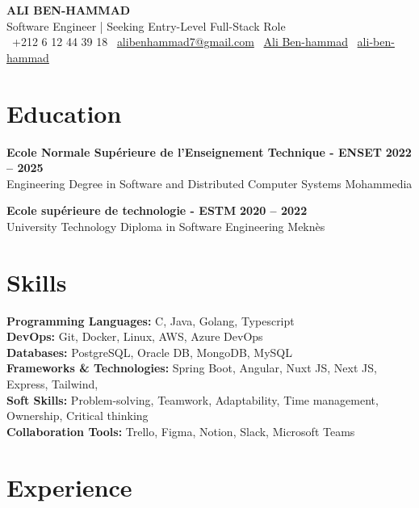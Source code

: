 \documentclass[10pt,a4paper]{article}  %
\newcommand{\resumeSubheading}[4]{
    \vspace{6pt}
    \noindent\textbf{\large #1} \hfill \textbf{#2} \\  %
    {\small #3} \hfill {\small #4} \\ %
    \vspace{-8pt}
}
\begin{document}
\begin{center}
    {\LARGE\textbf{\MakeUppercase{Ali Ben-hammad}}}\\
    \vspace{2pt}
    {\large Software Engineer | Seeking Entry-Level Full-Stack Role}\\
    \vspace{6pt}
    {\footnotesize \faPhone\ +212 6 12 44 39 18 \quad \faEnvelope\ \href{mailto:alibenhammad7@gmail.com}{alibenhammad7@gmail.com} \quad \faLinkedin\ \href{https://www.linkedin.com/in/ali-ben-hammad/}{Ali Ben-hammad} \quad \faGithub\ \href{https://github.com/ali-ben-hammad}{ali-ben-hammad}}
\end{center}

\section{Education}

\resumeSubheading
{Ecole Normale Supérieure de l'Enseignement Technique - ENSET}{2022 -- 2025}
{Engineering Degree in Software and Distributed Computer Systems}{Mohammedia}

\resumeSubheading
{Ecole supérieure de technologie - ESTM}{2020 -- 2022}
{University Technology Diploma in Software Engineering}{Meknès}

\section{Skills}
\noindent
\textbf{Programming Languages:} C, Java, Golang, Typescript\\
\textbf{DevOps:} Git, Docker, Linux, AWS, Azure DevOps\\
\textbf{Databases:} PostgreSQL, Oracle DB, MongoDB, MySQL\\
\textbf{Frameworks \& Technologies:} Spring Boot, Angular, Nuxt JS, Next JS, Express, Tailwind, \\
\textbf{Soft Skills:} Problem-solving, Teamwork, Adaptability, Time management, Ownership, Critical thinking\\
\textbf{Collaboration Tools:} Trello, Figma, Notion, Slack, Microsoft Teams\\


\section{Experience}
\end{document}
